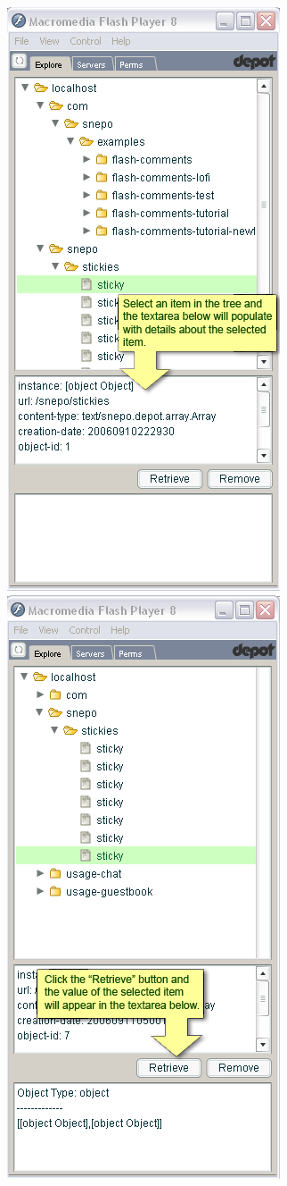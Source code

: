 \documentclass{report}
\begin{document}
\begin{center}
\includegraphics[scale=0.5]{users-images/Step6-annotated.png}
\includegraphics[scale=0.5]{users-images/Step7-annotated.png}
\end{center}
\end{document}
